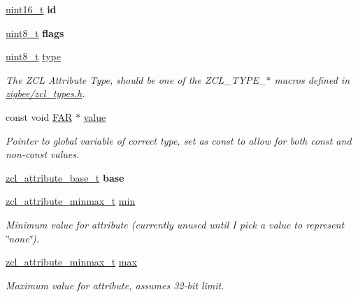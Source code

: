\begin{DoxyCompactItemize}
\hyperlink{group__hal__dos_ga5a8b2dc9e45a9ee81a94ef304fb62505}{uint16\+\_\+t} {\bfseries id}
\item 
\mbox{\label{group__zcl_gaa2585d779da0ab21273a8d92de9a0ebe}} 
\hyperlink{group__hal__dos_gae1affc9ca37cfb624959c866a73f83c2}{uint8\+\_\+t} {\bfseries flags}
\item 
\mbox{\label{group__zcl_ga1d127017fb298b889f4ba24752d08b8e}} 
\hyperlink{group__hal__dos_gae1affc9ca37cfb624959c866a73f83c2}{uint8\+\_\+t} \hyperlink{group__zcl_ga1d127017fb298b889f4ba24752d08b8e}{type}
\begin{DoxyCompactList}\small\item\em The Z\+CL Attribute Type, should be one of the Z\+C\+L\+\_\+\+T\+Y\+P\+E\+\_\+$\ast$ macros defined in \hyperlink{zcl__types_8h}{zigbee/zcl\+\_\+types.\+h}. \end{DoxyCompactList}\item 
const void \hyperlink{group__hal_gaef060b3456fdcc093a7210a762d5f2ed}{F\+AR} $\ast$ \hyperlink{group__zcl_gaaaa0b89997c57cfca2dfae40f46e702d}{value}
\begin{DoxyCompactList}\small\item\em Pointer to global variable of correct type, set as {\ttfamily const} to allow for both const and non-\/const values. \end{DoxyCompactList}\item 
\mbox{\label{group__zcl_ga8f041b4b145b30d5f92acdcb08ba43a3}} 
\hyperlink{structzcl__attribute__base__t}{zcl\+\_\+attribute\+\_\+base\+\_\+t} {\bfseries base}
\item 
\hyperlink{unionzcl__attribute__minmax__t}{zcl\+\_\+attribute\+\_\+minmax\+\_\+t} \hyperlink{group__zcl_gaad888af9d07cd3b611c75f15f8c90dfe}{min}
\begin{DoxyCompactList}\small\item\em Minimum value for attribute (currently unused until I pick a value to represent \char`\"{}none\char`\"{}). \end{DoxyCompactList}\item 
\hyperlink{unionzcl__attribute__minmax__t}{zcl\+\_\+attribute\+\_\+minmax\+\_\+t} \hyperlink{group__zcl_gae2490849003f8344782c06334b1e6b17}{max}
\begin{DoxyCompactList}\small\item\em Maximum value for attribute, assumes 32-\/bit limit. \end{DoxyCompactList}\item 

\end{DoxyCompactItemize}
